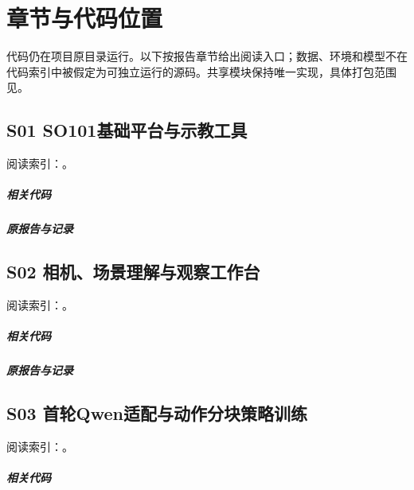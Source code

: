 \chapter{章节与代码位置}
\label{app:code}
代码仍在项目原目录运行。以下按报告章节给出阅读入口；数据、环境和模型不在代码索引中被假定为可独立运行的源码。共享模块保持唯一实现，具体打包范围见。
\section*{S01 SO101基础平台与示教工具}
\hypertarget{code-s01}{}
阅读索引：。
\paragraph{相关代码}
\noindent{}\par
\noindent{}\par
\noindent{}\par
\paragraph{原报告与记录}
\noindent{}\par
\noindent{}\par
\section*{S02 相机、场景理解与观察工作台}
\hypertarget{code-s02}{}
阅读索引：。
\paragraph{相关代码}
\noindent{}\par
\noindent{}\par
\noindent{}\par
\paragraph{原报告与记录}
\noindent{}\par
\section*{S03 首轮Qwen适配与动作分块策略训练}
\hypertarget{code-s03}{}
阅读索引：。
\paragraph{相关代码}
\noindent{}\par
